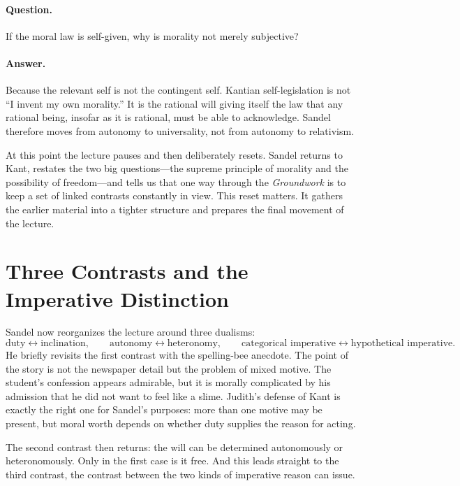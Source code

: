 \paragraph{Question.} If the moral law is self-given, why is morality not merely subjective?

\paragraph{Answer.} Because the relevant self is not the contingent self. Kantian self-legislation is not ``I invent my own morality.'' It is the rational will giving itself the law that any rational being, insofar as it is rational, must be able to acknowledge. Sandel therefore moves from autonomy to universality, not from autonomy to relativism.

At this point the lecture pauses and then deliberately resets. Sandel returns to Kant, restates the two big questions---the supreme principle of morality and the possibility of freedom---and tells us that one way through the \emph{Groundwork} is to keep a set of linked contrasts constantly in view. This reset matters. It gathers the earlier material into a tighter structure and prepares the final movement of the lecture.

\section{Three Contrasts and the Imperative Distinction}

Sandel now reorganizes the lecture around three dualisms:
\begin{equation}
\text{duty} \leftrightarrow \text{inclination},
\qquad
\text{autonomy} \leftrightarrow \text{heteronomy},
\qquad
\text{categorical imperative} \leftrightarrow \text{hypothetical imperative}.
\end{equation}
He briefly revisits the first contrast with the spelling-bee anecdote. The point of the story is not the newspaper detail but the problem of mixed motive. The student's confession appears admirable, but it is morally complicated by his admission that he did not want to feel like a slime. Judith's defense of Kant is exactly the right one for Sandel's purposes: more than one motive may be present, but moral worth depends on whether duty supplies the reason for acting.

The second contrast then returns: the will can be determined autonomously or heteronomously. Only in the first case is it free. And this leads straight to the third contrast, the contrast between the two kinds of imperative reason can issue.

